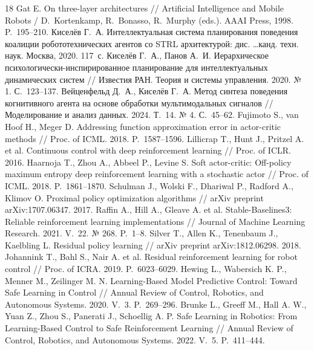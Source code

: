 \documentclass[11pt]{article}
\begin{document}
{\scriptsize\begin{thebibliography}{18}
Gat E. On three-layer architectures
// Artificial Intelligence and Mobile Robots / D.~Kortenkamp, R.~Bonasso, R.~Murphy (eds.). AAAI Press, 1998. P.~195--210.
Киселёв Г.~А. Интеллектуальная система планирования поведения коалиции робототехнических агентов со STRL архитектурой:
дис. \dots канд. техн. наук. Москва, 2020. 117~с.
Киселёв Г.~А., Панов А.~И. Иерархическое психологически-инспирированное планирование для интеллектуальных динамических систем
// Известия РАН. Теория и системы управления. 2020. № 1. С.~123--137.
Вейценфельд Д.~А., Киселёв Г.~А. Метод синтеза поведения когнитивного агента на основе обработки мультимодальных сигналов
// Моделирование и анализ данных. 2024. Т.~14. № 4. С.~45--62.
Fujimoto S., van Hoof H., Meger D. Addressing function approximation error in actor-critic methods
// Proc. of ICML. 2018. P.~1587--1596.
Lillicrap T., Hunt J., Pritzel A. et al. Continuous control with deep reinforcement learning
// Proc. of ICLR. 2016.
Haarnoja T., Zhou A., Abbeel P., Levine S. Soft actor-critic: Off-policy maximum entropy deep reinforcement learning with a stochastic actor
// Proc. of ICML. 2018. P.~1861--1870.
Schulman J., Wolski F., Dhariwal P., Radford A., Klimov O. Proximal policy optimization algorithms
// arXiv preprint arXiv:1707.06347. 2017.
Raffin A., Hill A., Gleave A. et al. Stable-Baselines3: Reliable reinforcement learning implementations
// Journal of Machine Learning Research. 2021. V.~22. № 268. P.~1--8.
Silver T., Allen K., Tenenbaum J., Kaelbling L. Residual policy learning
// arXiv preprint arXiv:1812.06298. 2018.
Johannink T., Bahl S., Nair A. et al. Residual reinforcement learning for robot control
// Proc. of ICRA. 2019. P.~6023--6029.
Hewing L., Wabersich K. P., Menner M., Zeilinger M. N. Learning-Based Model Predictive Control: Toward Safe Learning in Control // Annual Review of Control, Robotics, and Autonomous Systems. 2020. V.~3. P.~269--296.
Brunke L., Greeff M., Hall A. W., Yuan Z., Zhou S., Panerati J., Schoellig A. P. Safe Learning in Robotics: From Learning-Based Control to Safe Reinforcement Learning // Annual Review of Control, Robotics, and Autonomous Systems. 2022. V.~5. P.~411--444.

\end{thebibliography}}
\end{document}
